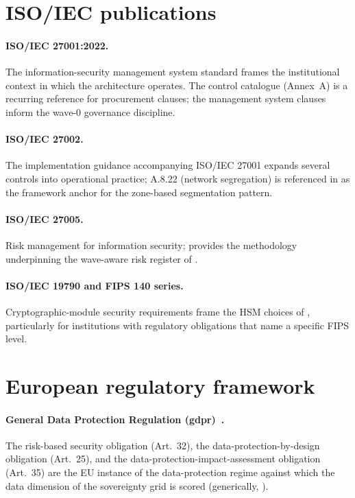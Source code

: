 \section{ISO/IEC publications}
\label{sec:er-iso}

\paragraph{ISO/IEC 27001:2022.} The information-security
management system standard frames the institutional context in
which the architecture operates. The control catalogue (Annex~A)
is a recurring reference for procurement clauses; the management
system clauses inform the wave-0 governance discipline.

\paragraph{ISO/IEC 27002.} The implementation guidance
accompanying ISO/IEC 27001 expands several controls into
operational practice; A.8.22 (network segregation) is referenced
in  as the framework anchor for the
zone-based segmentation pattern.

\paragraph{ISO/IEC 27005.} Risk management for information
security; provides the methodology underpinning the wave-aware
risk register of .

\paragraph{ISO/IEC 19790 and FIPS 140 series.} Cryptographic-module
security requirements frame the HSM choices of
, particularly for institutions with
regulatory obligations that name a specific FIPS level.

\section{European regulatory framework}
\label{sec:er-eu}

\paragraph{General Data Protection Regulation
(\gls{gdpr})~\cite{gdpr}.} The risk-based security obligation
(Art.~32), the data-protection-by-design obligation (Art.~25),
and the data-protection-impact-assessment obligation (Art.~35)
are the EU instance of the data-protection regime against which
the data dimension of the sovereignty grid is scored (generically,
).


